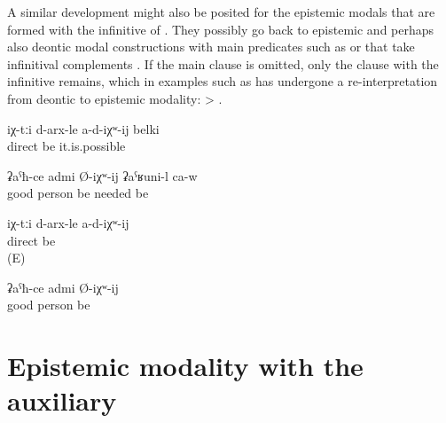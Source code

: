 A similar development might also be posited for the epistemic modals that are formed with the infinitive of . They possibly go back to epistemic and perhaps also deontic modal constructions with main predicates such as   or   that take infinitival complements . If the main clause is omitted, only the clause with the infinitive remains, which in examples such as  has undergone a re-interpretation from deontic to epistemic modality:   >  .
%
\begin{exe}
	\ex	\label{ex:Maybe they (= my thoughts) are not right}
	\gll	iχ-tːi	d-arx-le	a-d-iχʷ-ij	belki\\
			direct	be	it.is.possible\\
	\glt	{}

	\ex	\label{ex:He must be a good man / He should be a good man}
	\gll	ʡaˁħ-ce	admi	Ø-iχʷ-ij	ʡaˁʁuni-l	ca-w\\
		good	person	be	needed	be\\
	\glt	{}

	\ex	\label{ex:They (= my thoughts) are probably not right}
	\gll	iχ-tːi	d-arx-le	a-d-iχʷ-ij\\
			direct	be\\
	\glt	{} (E)

	\ex	\label{ex:He is probably a good man}
	\gll	ʡaˁħ-ce	admi	Ø-iχʷ-ij\\
		good	person	be\\
	\glt	{}
\end{exe}



\section{Epistemic modality with the auxiliary \protect{} \protect{}}
\label{sec:Epistemic modality with the auxiliary b-urk find}

